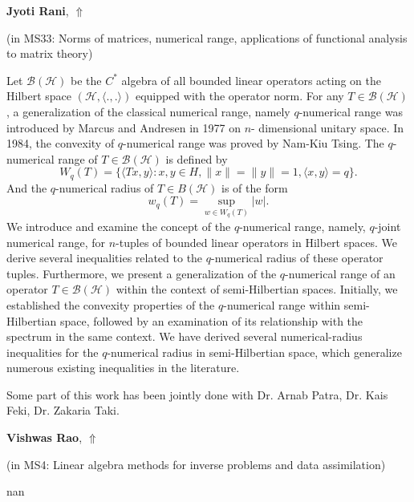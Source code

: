 \documentclass[ILAS2025-program.tex]{subfiles}
\begin{document}
\hypertarget{down0278}{}\begin{ilasabstract}
    
\textbf{Jyoti Rani},  \hfill \hyperlink{up0278}{$\Uparrow$}
    
    
(in {\color{mstitle}MS33: Norms of matrices, numerical range, applications of functional analysis to matrix theory})
        
\mtskip
    Let $\mathcal{B(H)}$ be the $C^*$ algebra of all bounded linear operators acting on the Hilbert space $(\mathcal{H}, \langle .,. \rangle )$ equipped with the operator norm. For any $T \in \mathcal{B(H)}$, 
a generalization of the classical numerical range, namely $q$-numerical range was introduced by Marcus and Andresen in 1977 on $n$- dimensional unitary space. In 1984, the convexity of $q$-numerical range was proved by Nam-Kiu Tsing. The $q$-numerical range of $T \in \mathcal{B}(\mathcal{H})$ is defined by 
\[
W_q(T)=\{ \langle Tx,y \rangle: x,y \in H, \|x\|=\|y\|=1, \langle x,y \rangle=q \}.
\]
		And the $q$-numerical radius of $T \in B(\mathcal{H})$ is of the form
\[
			w_q(T)=\sup_{w \in W_q(T)}|w|.
\]
We introduce and examine the concept of the $q$-numerical range, namely, $q$-joint numerical range, for $n$-tuples of bounded linear operators in Hilbert spaces. We derive several inequalities related to the $q$-numerical radius of these operator tuples. Furthermore, we present a generalization of the $q$-numerical range of an operator $T \in \mathcal{B}(\mathcal{H})$ within the context of semi-Hilbertian spaces. Initially, we established the convexity properties of the $q$-numerical range within semi-Hilbertian space, followed by an examination of its relationship with the spectrum in the same context. We have derived several numerical-radius inequalities for the $q$-numerical radius in semi-Hilbertian space, which generalize numerous existing inequalities in the literature. 

Some part of this work has been jointly done with Dr. Arnab Patra, Dr. Kais Feki, Dr. Zakaria Taki.
\end{ilasabstract}
    

\hypertarget{down0356}{}\begin{ilasabstract}
    
\textbf{Vishwas Rao},  \hfill \hyperlink{up0356}{$\Uparrow$}
    
    
(in {\color{mstitle}MS4: Linear algebra methods for inverse problems and data assimilation})
        
\mtskip
    nan
\end{ilasabstract}
    
\end{document}
